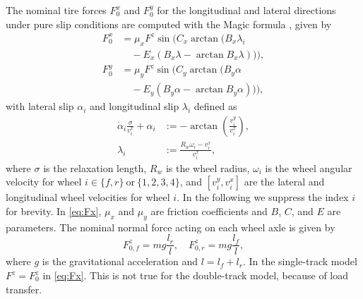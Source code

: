 \documentclass[11pt,a4paper]{article}
\begin{document}
The nominal tire forces $F^x_{0}$ and $F^y_{0}$ for the longitudinal and lateral directions under pure slip conditions are computed with the Magic formula \cite{Pacejka2006}, given by
\begin{equation}
	\label{eq:Fx}
	\begin{aligned}
		F^x_{0} &= \mu_x F^z 
		\sin\Big( C_{x} 
		\arctan\big(B_{x} \lambda_i \\
		& \quad -E_{x}(B_{x}\lambda-\arctan B_{x}\lambda)\big)\Big),
		\\ 
		F^y_{0} &= \mu_y F^z \sin\Big( C_{y} \arctan\big(B_{y} \alpha \\
		& \quad  -E_{y}(B_{y}\alpha-\arctan B_{y}\alpha)\big)\Big),
	\end{aligned}
\end{equation}
with  lateral slip $\alpha_i$ and  longitudinal slip
$\lambda_i$ 
defined as
\begin{subequations}
	\begin{align}
		\dot{\alpha}_i \frac{\sigma}{v^x_{i}} + \alpha_i &:= -\arctan \left( \frac{v^y_{i}}{v^x_{i}} \right), \label{eq:alpha}\\
		\lambda_i &:= \frac{R_w \omega_i - v^x_{i}}{v^x_{i}},\label{eq:lambda} 
	\end{align}\label{eq:slip}%
\end{subequations}
where $\sigma$ is the relaxation length, $R_w$ is the wheel radius,
$\omega_{i}$ is the wheel angular velocity for wheel ${i\in \{f,r\}\ \text{or} \ \{1,2,3,4\}}$, and
$[v^y_{i},v^x_{i}]$ are the lateral and longitudinal wheel
velocities for wheel $i$. In the following we suppress the index $i$ for brevity. 
In
\eqref{eq:Fx}, $\mu_x$ and $\mu_y$ are friction
coefficients and $B$, $C$, and $E$ are parameters.
 The nominal 
normal force acting on each wheel axle is given by
\begin{equation*} %
F^z_{0,f} =  mg\frac{l_r}{l}, \quad F^z_{0,r} =  mg\frac{l_f}{l}, 
\end{equation*}
where $g$ is the gravitational acceleration and $l = l_f + l_r$. In the single-track model $F^z = F^z_0 $ in \eqref{eq:Fx}. This is not true for the double-track model, because of load transfer.
\end{document}
